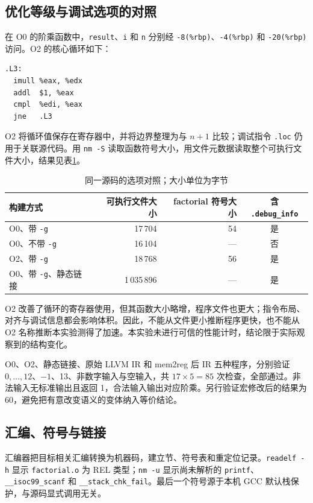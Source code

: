 \documentclass[UTF8,a4paper,10pt,fontset=fandol]{ctexart}
\begin{document}
\subsection{优化等级与调试选项的对照}
在 O0 的阶乘函数中，\texttt{result}、\texttt{i} 和 \texttt{n} 分别经 \texttt{-8(\%rbp)}、\texttt{-4(\%rbp)} 和 \texttt{-20(\%rbp)} 访问。O2 的核心循环如下：
\par\noindent\begin{minipage}{\linewidth}
\begin{lstlisting}[numbers=none]
.L3:
  imull %eax, %edx
  addl  $1, %eax
  cmpl  %edi, %eax
  jne   .L3
\end{lstlisting}
\end{minipage}\par
O2 将循环值保存在寄存器中，并将边界整理为与 $n+1$ 比较；调试指令 \texttt{.loc} 仍用于关联源代码。用 \texttt{nm -S} 读取函数符号大小，用文件元数据读取整个可执行文件大小，结果见表\ref{tab:options}。

\begin{table}[H]
\centering\small
\caption{同一源码的选项对照；大小单位为字节}\label{tab:options}
\begin{tabular}{lrrc}
\toprule
构建方式 & 可执行文件大小 & factorial 符号大小 & 含 \texttt{.debug\_info}\\
\midrule
O0、带 \texttt{-g} & 17\,704 & 54 & 是\\
O0、不带 \texttt{-g} & 16\,104 & --- & 否\\
O2、带 \texttt{-g} & 18\,768 & 56 & 是\\
O0、带 \texttt{-g}、静态链接 & 1\,035\,896 & --- & 是\\
\bottomrule
\end{tabular}
\end{table}
O2 改善了循环的寄存器使用，但其函数大小略增，程序文件也更大；指令布局、对齐与调试信息都会影响体积。因此，不能从文件更小推断程序更快，也不能从 O2 名称推断本实验测得了加速。本实验未进行可信的性能计时，结论限于实际观察到的结构变化。

O0、O2、静态链接、原始 LLVM IR 和 mem2reg 后 IR 五种程序，分别验证 $0,\ldots,12$、$-1$、13、非数字输入与空输入，共 $17\times5=85$ 次检查，全部通过。非法输入无标准输出且返回 1，合法输入输出对应阶乘。另行验证宏修改后的结果为 60，避免把有意改变语义的变体纳入等价结论。

\subsection{汇编、符号与链接}
汇编器把目标相关汇编转换为机器码，建立节、符号表和重定位记录。\texttt{readelf -h} 显示 \texttt{factorial.o} 为 REL 类型；\texttt{nm -u} 显示尚未解析的 \texttt{printf}、\texttt{\_\_isoc99\_scanf} 和 \texttt{\_\_stack\_chk\_fail}。最后一个符号源于本机 GCC 默认栈保护，与源码显式调用无关。
\end{document}
